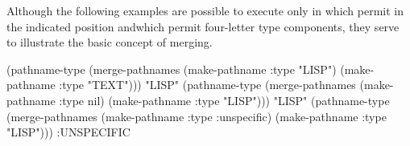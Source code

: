 
Although the following examples are possible to execute only in
 which permit  in the indicated
position andwhich permit four-letter type components, they serve to illustrate
the basic concept of  merging.

\medbreak
\code
 (pathname-type 
   (merge-pathnames (make-pathname :type "LISP")
                    (make-pathname :type "TEXT")))
\EV "LISP"
\smallbreak
 (pathname-type 
   (merge-pathnames (make-pathname :type nil)
                    (make-pathname :type "LISP")))
\EV "LISP"
\smallbreak
 (pathname-type 
   (merge-pathnames (make-pathname :type :unspecific)
                    (make-pathname :type "LISP")))
\EV :UNSPECIFIC
\endcode

\endsubsubsection%

\endsubSection%

